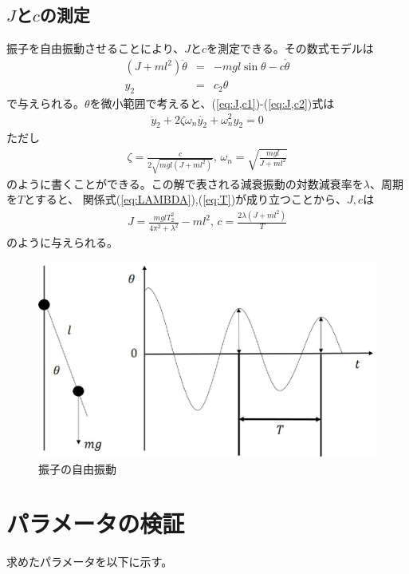 \documentclass[a4j,11pt,twoside]{ujbook}
\begin{document}
	\subsection{$J$と$c$の測定}
	振子を自由振動させることにより、$J$と$c$を測定できる。その数式モデルは
	\begin{eqnarray}
		(J+ml^2)\ddot{\theta} & = & -mgl\sin{\theta} - c\dot{\theta}
		\label{eq:J,c1}\\
		y_2 & = & c_2\theta
		\label{eq:J,c2}
	\end{eqnarray}
	で与えられる。$\theta$を微小範囲で考えると、(\ref{eq:J,c1})-(\ref{eq:J,c2})式は
	\begin{eqnarray*}
		\ddot{y}_2 + 2\zeta\omega_n\dot{y_2} + \omega_n^2y_2 = 0
	\end{eqnarray*}
	ただし
	\begin{eqnarray*}
		\zeta = \frac{c}{2\sqrt{mgl(J + ml^2)}},\,
		\omega_n = \sqrt{\frac{mgl}{J + ml^2}}
	\end{eqnarray*}
	のように書くことができる。この解で表される減衰振動の対数減衰率を$\lambda$、周期を$T$とすると、
	関係式(\ref{eq:LAMBDA}),(\ref{eq:T})が成り立つことから、$J,c$は
	\begin{eqnarray}
		J = \frac{mglT_2^2}{4\pi^2 + \lambda^2} - ml^2 ,\, c = \frac{2\lambda(J +
		ml^2)}{T}
	\end{eqnarray}
	のように与えられる。

	\begin{figure}[htbp]
		\begin{center}
			\includegraphics[width = 0.7 \linewidth]{freePend.eps}
			\caption{振子の自由振動}
			\label{fig:振子の自由振動}
		\end{center}
	\end{figure}


\section{パラメータの検証}
求めたパラメータを以下に示す。
\end{document}
